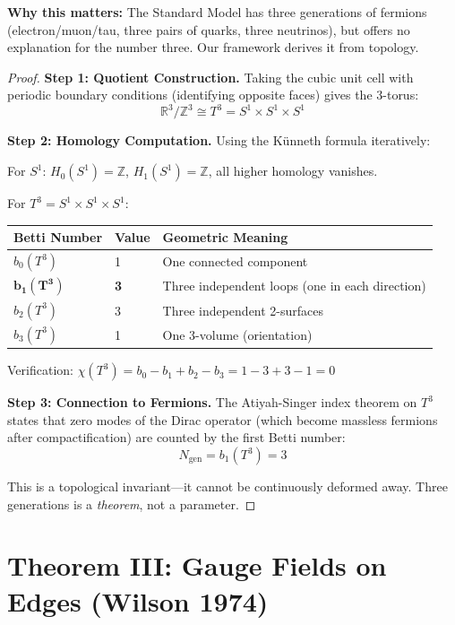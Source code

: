 \documentclass[11pt,a4paper]{article}
\theoremstyle{plain}
\theoremstyle{definition}
\theoremstyle{remark}
\newcommand{\Ngen}{N_{\text{gen}}}
\begin{document}
\textbf{Why this matters:} The Standard Model has three generations of fermions (electron/muon/tau, three pairs of quarks, three neutrinos), but offers no explanation for the number three. Our framework derives it from topology.

\begin{proof}
\textbf{Step 1: Quotient Construction.} Taking the cubic unit cell with periodic boundary conditions (identifying opposite faces) gives the 3-torus:
\[
\mathbb{R}^3/\mathbb{Z}^3 \cong T^3 = S^1 \times S^1 \times S^1
\]

\textbf{Step 2: Homology Computation.} Using the K\"unneth formula iteratively:

For $S^1$: $H_0(S^1) = \mathbb{Z}$, $H_1(S^1) = \mathbb{Z}$, all higher homology vanishes.

For $T^3 = S^1 \times S^1 \times S^1$:

\begin{center}
\begin{tabular}{lll}
\toprule
\textbf{Betti Number} & \textbf{Value} & \textbf{Geometric Meaning} \\
\midrule
$b_0(T^3)$ & 1 & One connected component \\
$\mathbf{b_1(T^3)}$ & \textbf{3} & Three independent loops (one in each direction) \\
$b_2(T^3)$ & 3 & Three independent 2-surfaces \\
$b_3(T^3)$ & 1 & One 3-volume (orientation) \\
\bottomrule
\end{tabular}
\end{center}

Verification: $\chi(T^3) = b_0 - b_1 + b_2 - b_3 = 1 - 3 + 3 - 1 = 0$ \checkmark

\textbf{Step 3: Connection to Fermions.} The Atiyah-Singer index theorem on $T^3$ states that zero modes of the Dirac operator (which become massless fermions after compactification) are counted by the first Betti number:
\[
\Ngen = b_1(T^3) = 3
\]

This is a topological invariant---it cannot be continuously deformed away. Three generations is a \emph{theorem}, not a parameter.
\end{proof}

\section{Theorem III: Gauge Fields on Edges (Wilson 1974)}
\end{document}

